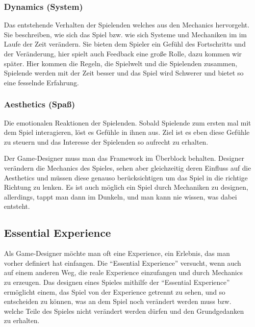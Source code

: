 \subsubsection{Dynamics (System)}

Das entstehende Verhalten der Spielenden welches aus den Mechanics hervorgeht\cite{_mda}. Sie beschreiben, wie sich das Spiel bzw. wie sich Systeme und Mechaniken im  im Laufe der Zeit verändern. Sie bieten dem Spieler ein Gefühl des Fortschritts und der Veränderung, hier spielt auch Feedback eine große Rolle, dazu kommen wir später. Hier kommen die Regeln, die Spielwelt und die Spielenden zusammen, Spielende werden mit der Zeit besser und das Spiel wird Schwerer und bietet so eine fesselnde Erfahrung.

\subsubsection{Aesthetics (Spaß)}

Die emotionalen Reaktionen der Spielenden. Sobald Spielende zum ersten mal mit dem Spiel interagieren, löst es Gefühle in ihnen aus. Ziel ist es eben diese Gefühle zu steuern und das Interesse der Spielenden so aufrecht zu erhalten.\newline

\noindent Der Game-Designer muss man das Framework im Überblock behalten. Designer verändern die Mechanics des Spieles, sehen aber gleichzeitig deren Einfluss auf die Aesthetics und müssen diese genauso berücksichtigen um das Spiel in die richtige Richtung zu lenken. 
Es ist auch möglich ein Spiel durch Mechaniken zu designen, allerdings, tappt man dann im Dunkeln, und man kann nie wissen, was dabei entsteht. \cite[S.56]{_art_of_gamedesign}

\subsection{Essential Experience}

Als Game-Designer möchte man oft eine Experience, ein Erlebnis, das man vorher definiert hat einfangen. Die "`Essential Experience"' versucht, wenn auch auf einem anderen Weg, die reale Experience einzufangen und durch Mechanics zu erzeugen. Das designen eines Spieles mithilfe der "`Essential Experience"' ermöglicht einem, das Spiel von der Experience getrennt zu sehen, und so entscheiden zu können, was an dem Spiel noch verändert werden muss bzw. welche Teile des Spieles nicht verändert werden dürfen und den Grundgedanken zu erhalten. \cite[S.55]{_art_of_gamedesign}

